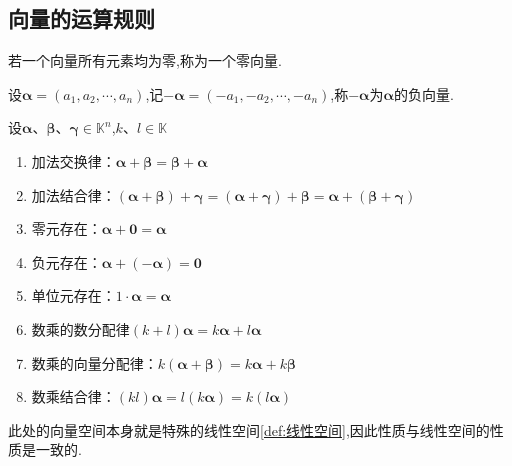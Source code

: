 \subsection{向量的运算规则}
\begin{formal}
\begin{definition}[零向量]\label{def:零向量}
    若一个向量所有元素均为零,称为一个零向量.
\end{definition}
\end{formal}
\begin{formal}
\begin{definition}[负向量]\label{def:负向量} 
    设$\bm{\alpha}=\left(a_1,a_2,\cdots,a_n\right)$,记$-\bm{\alpha}=
    \left(-a_1,-a_2,\cdots,-a_n\right)$,称$-\bm{\alpha}$为$\bm{\alpha}$的负向量.
\end{definition}
\end{formal}
\begin{formal}
\begin{proposition}[$n$维向量空间的若干性质]\label{pop:n维向量空间的若干性质}
设$\bm{\alpha} $、$\bm{\beta} $、$\bm{
    \gamma} \in
\mathbb{K}^n$,$k$、$l\in \mathbb{K}$
\begin{enumerate}[label=\textup{(\arabic*)}]
    \item 加法交换律：$\bm{\alpha } + \bm{\beta} =
    \bm{\beta} +\bm{\alpha }
    $
    \item 加法结合律：$\left(\bm{\alpha} +\bm{ \beta}
     \right) +
    \bm{\gamma} =\left(
        \bm{\alpha} + \bm{\gamma }
    \right) + \bm{\beta}  = \bm{\alpha
     } +
    \left(\bm{\beta} + \bm{\gamma}
     \right)
    $
    \item 零元存在：$\bm{\alpha }+ \bm{0} = \bm{\alpha }
    $
\item 负元存在：$\bm{\alpha }+\left(-\bm{\alpha }
    \right) = \bm{0}
    $
    \item 单位元存在：$1\cdot\bm{\alpha } = \bm{\alpha }
    $
    \item 数乘的数分配律$ \left(k + l\right)\bm{\alpha }
    =k\bm{\alpha }+l\bm{\alpha }
    $
    \item 数乘的向量分配律：$k\left(\bm{\alpha }+
    \bm{\beta }\right) = 
    k\bm{\alpha }+ k\bm{\beta }
    $
    \item 数乘结合律：$\left(kl\right)\bm{\alpha }
    =l\left(k\bm{\alpha }\right)
    =k\left(l\bm{\alpha }\right)$
\end{enumerate}
\end{proposition}
\end{formal}
\begin{red}
    \begin{remark}
        此处的向量空间本身就是特殊的线性空间\cref{def:线性空间},因此性质与线性空间的性质是一致的.
    \end{remark}
\end{red}
\newpage
